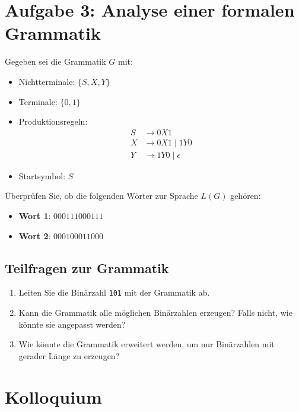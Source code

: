 \documentclass[a4paper,12pt]{article}
\begin{document}
	\section*{Aufgabe 3: Analyse einer formalen Grammatik}
		Gegeben sei die Grammatik $G$ mit:
	\begin{itemize}
		\item Nichtterminale: $\{S, X, Y\}$
		\item Terminale: $\{0, 1\}$
		\item Produktionsregeln:
		\begin{align*}
			S &\rightarrow 0 X 1 \\
			X &\rightarrow 0 X 1 \mid 1 Y 0 \\
			Y &\rightarrow 1 Y 0 \mid \epsilon
		\end{align*}
		\item Startsymbol: $S$
	\end{itemize}
		Überprüfen Sie, ob die folgenden Wörter zur Sprache \( L(G) \) gehören:
	\begin{itemize}
		\item \textbf{Wort 1}: \( 000111000111 \)
		\item \textbf{Wort 2}: \( 000100011000\)
	\end{itemize}
	
	\subsection*{Teilfragen zur Grammatik}
	\begin{enumerate}
		\item Leiten Sie die Binärzahl \texttt{101} mit der Grammatik ab.
		\item Kann die Grammatik alle möglichen Binärzahlen erzeugen? Falls nicht, wie könnte sie angepasst werden?
		\item Wie könnte die Grammatik erweitert werden, um nur Binärzahlen mit gerader Länge zu erzeugen?
	\end{enumerate}
	
		\vspace{1cm}
	
	\section*{Kolloquium}
\end{document}
